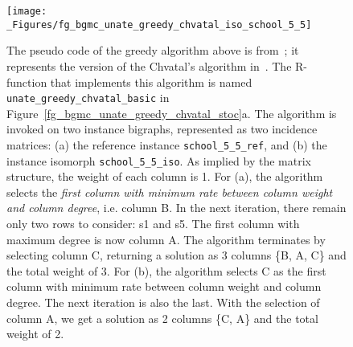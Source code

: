 \begin{figure}[t!]
\vspace*{-2ex}
\centering
\texttt{[image: \_Figures/fg\_bgmc\_unate\_greedy\_chvatal\_iso\_school\_5\_5]}
\caption{
The pseudo code of the greedy algorithm above is 
from~\cite{OPUS-setc-2016-Springer-Young-Greedy};
it represents the version of the Chvatal's algorithm 
in~\cite{OPUS-setc-1979-OR-Chvatal-greedy}.
The R-function that implements this algorithm is named
{\tt unate\_greedy\_chvatal\_basic} 
in Figure~\ref{fg_bgmc_unate_greedy_chvatal_stoc}a.
%
The algorithm is invoked on two instance bigraphs, represented
as two incidence matrices:
(a) the reference instance {\tt school\_5\_5\_ref}, and 
(b) the instance isomorph  {\tt school\_5\_5\_iso}.
As implied by the matrix structure, the weight of each column is 1.
For (a), the algorithm selects the 
{\it first column with minimum rate between column weight and column degree},
i.e. column B. In the next iteration, there remain only two rows to consider: s1 and s5. The first column with maximum degree is now column A. The algorithm terminates by selecting column C, returning a solution as 3 columns \{B, A, C\} and the total weight of 3.
%
For (b), the algorithm selects C as the first column with minimum rate between column weight and column degree. The next iteration is also the last. With the selection of
column A,  we get a solution as 2 columns \{C, A\} and the total weight of 2.
\vspace*{-4ex}
}
\label{fg_bgmc_unate_greedy_chvatal_iso_school_5_5}
\end{figure}
